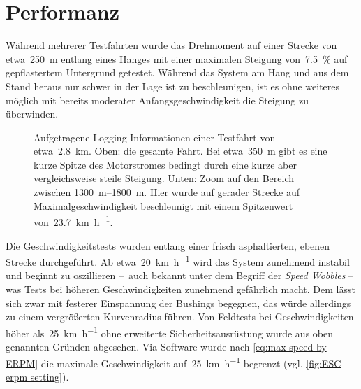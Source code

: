 	\section{Performanz}
		Während mehrerer Testfahrten wurde das Drehmoment auf einer Strecke von etwa~\qty{250}{\metre} entlang eines Hanges mit einer maximalen Steigung von~\qty{7,5}{\percent} auf gepflastertem Untergrund getestet.
		Während das System am Hang und aus dem Stand heraus nur schwer in der Lage ist zu beschleunigen, ist es ohne weiteres möglich mit bereits moderater Anfangsgeschwindigkeit die Steigung zu überwinden.
		\begin{figure}[h]
			\centering
			
			\caption[Aufgetragene Logging-Informationen einer Testfahrt]{Aufgetragene Logging-Informationen einer Testfahrt von etwa~\qty{2,8}{\kilo\metre}. Oben: die gesamte Fahrt. Bei etwa~\qty{350}{\metre} gibt es eine kurze Spitze des Motorstromes bedingt durch eine kurze aber vergleichsweise steile Steigung. Unten: Zoom auf den Bereich zwischen \qtyrange{1300}{1800}{\metre}. Hier wurde auf gerader Strecke auf Maximalgeschwindigkeit beschleunigt mit einem Spitzenwert von~\qty{23,7}{\kilo\metre\per\hour}.}%
			\label{fig:esc testdrive plot}
		\end{figure}
		Die Geschwindigkeitstests wurden entlang einer frisch asphaltierten, ebenen Strecke durchgeführt.
		Ab etwa~\qty{20}{\kilo\metre\per\hour} wird das System zunehmend instabil und beginnt zu oszillieren --~auch bekannt unter dem Begriff der \textit{Speed Wobbles} -- was Tests bei höheren Geschwindigkeiten zunehmend gefährlich macht.
		Dem lässt sich zwar mit festerer Einspannung der Bushings begegnen, das würde allerdings zu einem vergrößerten Kurvenradius führen.
		Von Feldtests bei Geschwindigkeiten höher als~\qty{25}{\kilo\metre\per\hour} ohne erweiterte Sicherheitsausrüstung wurde aus oben genannten Gründen abgesehen.
		Via Software wurde nach \cref{eq:max speed by ERPM} die maximale Geschwindigkeit auf~\qty{25}{\kilo\metre\per\hour} begrenzt (vgl. \cref{fig:ESC erpm setting}).
